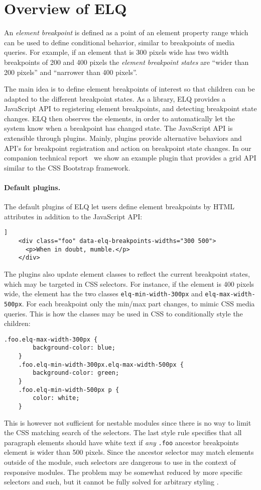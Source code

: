 \documentclass[sigplan,9pt]{acmart}
\newcommand{\elq}{ELQ}
\newcommand{\code}[1]{\texttt{#1}}
\begin{document}
\section{Overview of \elq{}}\label{sec:elq}\label{sec:elq-api}
  An \emph{element breakpoint} is defined as a point of an element
  property range which can be used to define conditional behavior,
  similar to breakpoints of media queries.  For example, if an element
  that is 300 pixels wide has two width breakpoints of 200 and 400
  pixels the {\em element breakpoint states} are ``wider than 200
  pixels'' and ``narrower than 400 pixels''.

  The main idea is to define element breakpoints of interest so that children can be adapted to the different breakpoint states.
  As a library, \elq{} provides a JavaScript API to registering element breakpoints, and detecting breakpoint state changes.
  \elq{} then observes the elements, in order to automatically let the system know when a breakpoint has changed state.
  The JavaScript API is extensible through plugins.
  Mainly, plugins provide alternative behaviors and API's for breakpoint registration and action on breakpoint state changes.
  In our companion technical report~\cite{WienerEH15} we show an example plugin that provides a grid API similar to the CSS Bootstrap framework.

  \paragraph{Default plugins.}
  The default plugins of \elq{} let users define element breakpoints by HTML attributes in addition to the JavaScript API:
  \begin{lstlisting}[gobble=4,caption={},captionpos=b,label={}]]
    <div class="foo" data-elq-breakpoints-widths="300 500">
      <p>When in doubt, mumble.</p>
    </div>
  \end{lstlisting}
  The plugins also update element classes to reflect the current breakpoint states, which may be targeted in CSS selectors.
  For instance, if the element is 400 pixels wide, the element has the two classes \code{elq-min-width-300px} and \code{elq-max-width-500px}.
  For each breakpoint only the min/max part changes, to mimic CSS media queries.
  This is how the classes may be used in CSS to conditionally style the children:
  \begin{lstlisting}[gobble=4]
    .foo.elq-max-width-300px {
        background-color: blue;
    }
    .foo.elq-min-width-300px.elq-max-width-500px {
        background-color: green;
    }
    .foo.elq-min-width-500px p {
        color: white;
    }
  \end{lstlisting}
  This is however not sufficient for nestable modules since there is no way to limit the CSS matching search of the selectors.
  The last style rule specifies that all paragraph elements should have white text if \emph{any} \code{.foo} ancestor breakpoints element is wider than 500 pixels.
  Since the ancestor selector may match elements outside of the module, such selectors are dangerous to use in the context of responsive modules.
  The problem may be somewhat reduced by more specific selectors and such, but it cannot be fully solved for arbitrary styling \cite{elq-thesis}.
\end{document}
